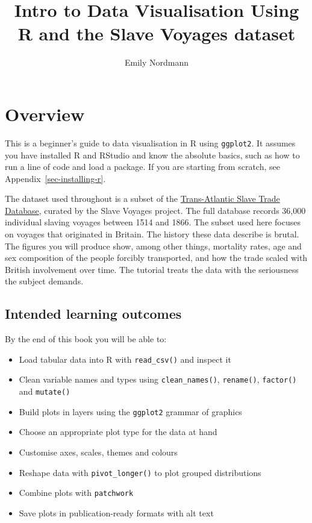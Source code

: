 \documentclass[
  english,
  letterpaper,
]{book}
\title{Intro to Data Visualisation Using R and the Slave Voyages
dataset}
\author{Emily Nordmann}
\date{}
\providecommand{\tightlist}{%
  \setlength{\itemsep}{0pt}\setlength{\parskip}{0pt}}
\renewcommand*\contentsname{Table of contents}
\newcommand\contentsname{Table of contents}
\begin{document}
\frontmatter
\maketitle

\renewcommand*\contentsname{Table of contents}
{
\setcounter{tocdepth}{2}
\tableofcontents
}

\mainmatter
{}

\chapter*{Overview}\label{overview}


This is a beginner's guide to data visualisation in R using
\texttt{ggplot2}. It assumes you have installed R and RStudio and know
the absolute basics, such as how to run a line of code and load a
package. If you are starting from scratch, see
Appendix~\ref{sec-installing-r}.

The dataset used throughout is a subset of the
\href{https://www.slavevoyages.org/}{Trans-Atlantic Slave Trade
Database}, curated by the Slave Voyages project. The full database
records 36,000 individual slaving voyages between 1514 and 1866. The
subset used here focuses on voyages that originated in Britain. The
history these data describe is brutal. The figures you will produce
show, among other things, mortality rates, age and sex composition of
the people forcibly transported, and how the trade scaled with British
involvement over time. The tutorial treats the data with the seriousness
the subject demands.

\section*{Intended learning outcomes}\label{intended-learning-outcomes}


By the end of this book you will be able to:

\begin{itemize}
\tightlist
\item
  Load tabular data into R with \texttt{read\_csv()} and inspect it
\item
  Clean variable names and types using \texttt{clean\_names()},
  \texttt{rename()}, \texttt{factor()} and \texttt{mutate()}
\item
  Build plots in layers using the \texttt{ggplot2} grammar of graphics
\item
  Choose an appropriate plot type for the data at hand
\item
  Customise axes, scales, themes and colours
\item
  Reshape data with \texttt{pivot\_longer()} to plot grouped
  distributions
\item
  Combine plots with \texttt{patchwork}
\item
  Save plots in publication-ready formats with alt text
\end{itemize}
\end{document}
